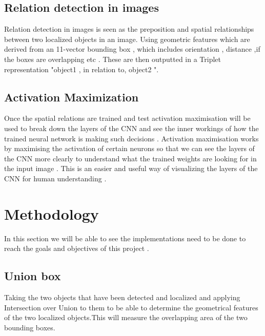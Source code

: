 \documentclass{csfyp}
\begin{document}
\subsection{Relation detection in images}
Relation detection in images is seen as the preposition and spatial relationships between two localized objects in an image. Using geometric features which are derived from an 11-vector bounding box , which includes orientation , distance ,if the boxes are overlapping etc . These are then outputted in a Triplet representation "object1 , in relation to, object2 ".

\subsection{Activation Maximization}
Once the spatial relations are trained and test activation maximisation will be used to break down the layers of the CNN and see the inner workings of how the trained neural network is making such decisions . Activation maximisation works by maximising the activation of certain neurons so that we can see the layers of the CNN more clearly to understand what the trained weights are looking for in the input image . This is an easier and useful way of visualizing the layers of the CNN for human understanding . 

\section{Methodology}
In this section we will be able to see the implementations need to be done to reach the goals and objectives of this project .

\subsection{Union box}
Taking the two objects that have been detected and localized and applying Intersection over Union to them to be able to determine the geometrical features of the two localized objects.This will measure the overlapping area of the two bounding boxes. 
\end{document}
